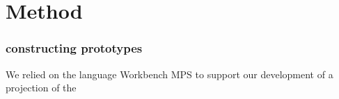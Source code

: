 \chapter{Method}\label{chapter:Method}

\subsection{constructing prototypes}


We relied on the language Workbench MPS to support our development of a projection of the 